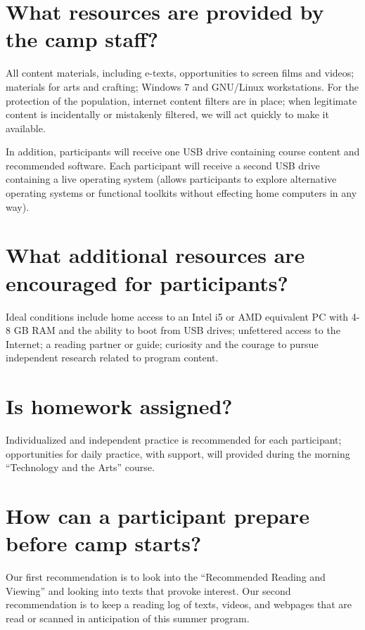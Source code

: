 \documentclass[letterpaper,10pt,english]{sphinxmanual}
\begin{document}
\section{What resources are provided by the camp staff?}
\label{faq:what-resources-are-provided-by-the-camp-staff}
All content materials, including e-texts, opportunities to screen films and videos; materials for arts and crafting; Windows 7 and GNU/Linux workstations. For the protection of the population, internet content filters are in place; when legitimate content is incidentally or mistakenly filtered, we will act quickly to make it available.

In addition, participants will receive one USB drive containing course content and recommended software. Each participant will receive a second USB drive containing a live operating system (allows participants to explore alternative operating systems or functional toolkits without effecting home computers in any way).


\section{What additional resources are encouraged for participants?}
\label{faq:what-additional-resources-are-encouraged-for-participants}
Ideal conditions include home access to an Intel i5 or AMD equivalent PC with 4-8 GB RAM and the ability to boot from USB drives; unfettered access to the Internet; a reading partner or guide; curiosity and the courage to pursue independent research related to program content.


\section{Is homework assigned?}
\label{faq:is-homework-assigned}
Individualized and independent practice is recommended for each participant; opportunities for daily practice, with support, will provided during the morning
``Technology and the Arts'' course.


\section{How can a participant prepare before camp starts?}
\label{faq:how-can-a-participant-prepare-before-camp-starts}
Our first recommendation is to look into the ``Recommended Reading and Viewing'' and looking into texts that provoke interest. Our second recommendation is to keep a reading log of texts, videos, and webpages that are read or scanned in anticipation of this summer program.
\end{document}
